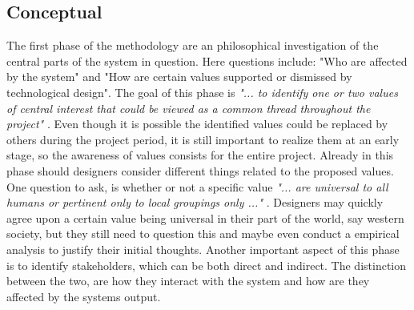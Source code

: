 \subsection{Conceptual}
The first phase of the methodology are an philosophical investigation of the central parts of the system in question. Here questions include: "Who are affected by the system" and "How are certain values supported or dismissed by technological design".\newline 
The goal of this phase is \textit{"... to identify one or two values of central interest that could be viewed as a common thread throughout the project"} \citep[p. 703]{IntegratingEthicsCummings}. Even though it is possible the identified values could be replaced by others during the project period, it is still important to realize them at an early stage, so the awareness of values consists for the entire project. Already in this phase should designers consider different things related to the proposed values. One question to ask, is whether or not a specific value \textit{"... are universal to all humans or pertinent only to local groupings only ..."} \citep[p. 326]{EmbodyingValues}. Designers may quickly agree upon a certain value being universal in their part of the world, say western society, but they still need to question this and maybe even conduct a empirical analysis to justify their initial thoughts. \newline
Another important aspect of this phase is to identify stakeholders, which can be both direct and indirect. The distinction between the two, are how they interact with the system and how are they affected by the systems output. 

